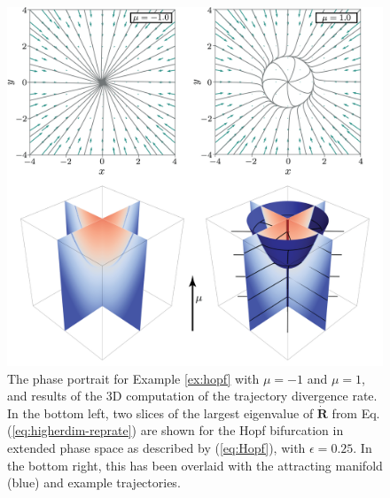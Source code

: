 \documentclass[twocolumn]{svjour3}
\begin{document}
\begin{figure}
	\centering
	\includegraphics[width=0.85\linewidth]{Fig19}
	\caption{The phase portrait for Example \ref{ex:hopf} with $\mu=-1$ and $\mu=1$, and results of the 3D computation of the trajectory divergence rate. In the bottom left, two slices of the largest eigenvalue of $\dot{\mathbf{R}}$ from Eq. (\ref{eq:higherdim-reprate}) are shown for the Hopf bifurcation in extended phase space as described by (\ref{eq:Hopf}), with $\epsilon=0.25$. In the bottom right, this has been overlaid with the attracting manifold (blue) and example trajectories.}
	\label{fig:Hopf}
\end{figure}
\end{document}
